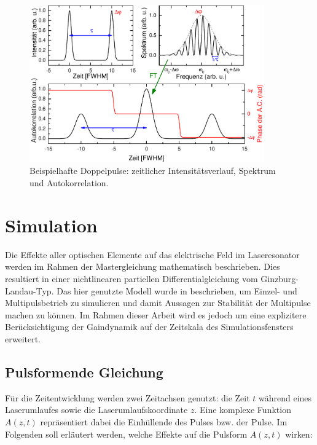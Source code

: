 \documentclass[bachelor,       %
               twoside,        %
               BCOR10mm,       %
               liststotoc,nomtotoc,bibtotoc, %
               english,ngerman, %
               final,          %
               ]{GAUBM}
\begin{document}
\begin{figure}[!htb]
	\centering
	\includegraphics[width=0.9\textwidth]{figures/pulsBsp}
	\caption{Beispielhafte Doppelpulse: zeitlicher Intensitätsverlauf, Spektrum und Autokorrelation.}
	\label{fig:PulsBsp}
\end{figure}

\section{Simulation}
\label{sec:SimTheo}
Die Effekte aller optischen Elemente auf das elektrische Feld im Laseresonator werden im Rahmen der Mastergleichung \cite{haus_mode-locking_2000} mathematisch beschrieben.
Dies resultiert in einer nichtlinearen partiellen Differentialgleichung vom Ginzburg-Landau-Typ.
Das hier genutzte Modell wurde in \cite{kalashnikov_multipulse_2003} beschrieben, um Einzel- und Multipulsbetrieb zu simulieren und damit Aussagen zur Stabilität der Multipulse machen zu können.
Im Rahmen dieser Arbeit wird es jedoch um eine explizitere Berücksichtigung der Gaindynamik auf der Zeitskala des Simulationsfensters erweitert.


\subsection{Pulsformende Gleichung}
Für die Zeitentwicklung werden zwei Zeitachsen genutzt: die Zeit $t$ während eines Laserumlaufes sowie die Laserumlaufskoordinate $z$.
Eine komplexe Funktion $A(z,t)$ repräsentiert dabei die Einhüllende des Pulses bzw. der Pulse. 
Im Folgenden soll erläutert werden, welche Effekte auf die Pulsform $A(z,t)$ wirken:
\end{document}
